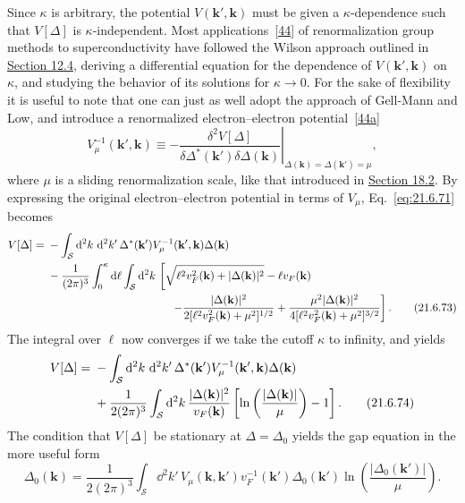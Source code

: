 Since $\kappa$ is arbitrary, the potential $V(\mathbf k',\mathbf k)$ must be given a $\kappa$-dependence such that $V[\Delta]$ is $\kappa$-independent. Most applications~\hyperref[ch21-ref-44]{[44]} of renormalization group methods to superconductivity have followed the Wilson approach outlined in \hyperref[sec:12.4]{Section 12.4}, deriving a differential equation for the dependence of $V(\mathbf k',\mathbf k)$ on $\kappa$, and studying the behavior of its solutions for $\kappa\to0$. For the sake of flexibility it is useful to note that one can just as well adopt the approach of Gell-Mann and Low, and introduce a renormalized electron--electron potential~\hyperref[ch21-ref-44a]{[44a]}
\begin{equation}
V_\mu^{-1}(\mathbf k',\mathbf k)
\equiv-
\left.
\frac{\delta^2V[\Delta]}
{\delta\Delta^*(\mathbf k')\delta\Delta(\mathbf k)}
\right|_{\Delta(\mathbf k)=\Delta(\mathbf k')=\mu},
\tag{21.6.72}\label{eq:21.6.72}
\end{equation}
where $\mu$ is a sliding renormalization scale, like that introduced in \hyperref[sec:18.2]{Section 18.2}. By expressing the original electron--electron potential in terms of $V_\mu$, Eq.~\eqref{eq:21.6.71} becomes
\begin{align}
V[\Delta]
={}&-\int_{\mathcal S}\dd^2k\,\dd^2k'\,
\Delta^*(\mathbf k')V_\mu^{-1}(\mathbf k',\mathbf k)\Delta(\mathbf k)
\notag\\
&-\frac{1}{(2\pi)^3}\int_0^\kappa \dd\ell
\int_{\mathcal S}\dd^2k\,
\left[
\sqrt{\ell^2v_F^2(\mathbf k)+|\Delta(\mathbf k)|^2}
-\ell v_F(\mathbf k)
\right.
\notag\\
&\hspace{11em}\left.
-\frac{|\Delta(\mathbf k)|^2}
{2[\ell^2v_F^2(\mathbf k)+\mu^2]^{1/2}}
+\frac{\mu^2|\Delta(\mathbf k)|^2}
{4[\ell^2v_F^2(\mathbf k)+\mu^2]^{3/2}}
\right].
\tag{21.6.73}\label{eq:21.6.73}
\end{align}
The integral over $\ell$ now converges if we take the cutoff $\kappa$ to infinity, and yields
\begin{align}
V[\Delta]
={}&-\int_{\mathcal S}\mathop{}\!\mathrm{d}^2k\,\mathop{}\!\mathrm{d}^2k'\,
\Delta^*(\mathbf k')V_\mu^{-1}(\mathbf k',\mathbf k)\Delta(\mathbf k)
\notag\\
&+\frac{1}{2(2\pi)^3}\int_{\mathcal S}\mathop{}\!\mathrm{d}^2k\,
\frac{|\Delta(\mathbf k)|^2}{v_F(\mathbf k)}
\left[
\ln\left(\frac{|\Delta(\mathbf k)|}{\mu}\right)-1
\right].
\tag{21.6.74}\label{eq:21.6.74}
\end{align}
The condition that $V[\Delta]$ be stationary at $\Delta=\Delta_0$ yields the gap equation in the more useful form
\begin{equation}
\Delta_0(\mathbf k)
=\frac{1}{2(2\pi)^3}
\int_{\mathcal S}\dd^2k'\,
V_\mu(\mathbf k,\mathbf k')v_F^{-1}(\mathbf k')
\Delta_0(\mathbf k')
\ln\left(\frac{|\Delta_0(\mathbf k')|}{\mu}\right).
\tag{21.6.75}\label{eq:21.6.75}
\end{equation}

